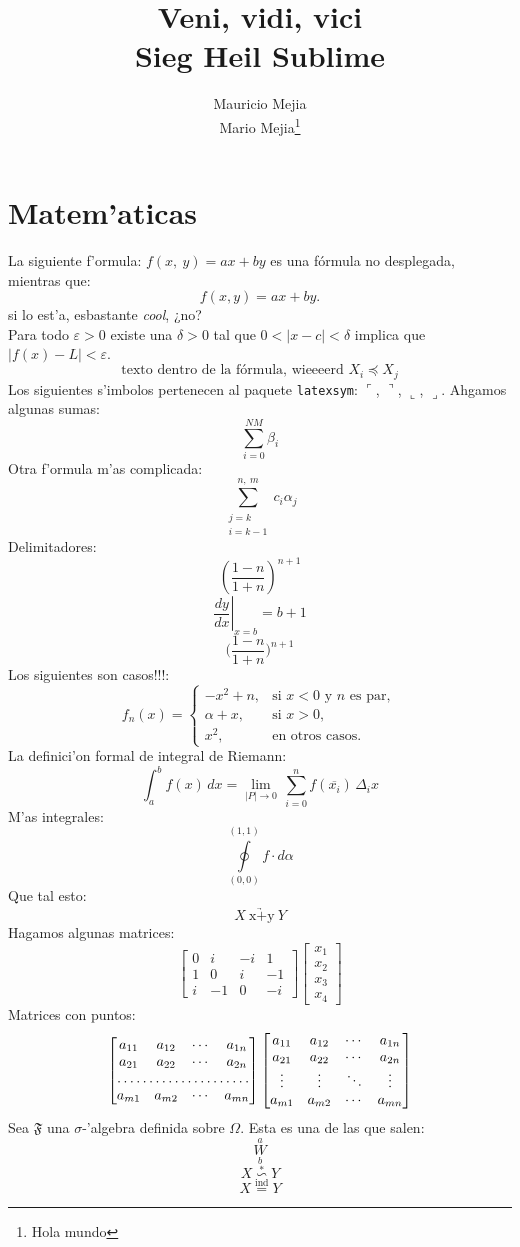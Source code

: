 \documentclass[11pt,titlepage]{article}
\title{Veni, vidi, vici\\\small{Sieg Heil Sublime}}
\author{Mauricio Mejia\\Mario Mejia\thanks{Hola mundo}}
\theoremstyle{plain}
\theoremstyle{defintion}
\theoremstyle{remark}
\begin{document}
\maketitle
\section{Matem'aticas}
La siguiente f'ormula: $f(x,\ y)=ax+by$ es una fórmula no desplegada, mientras que:
\[f(x,y)=ax+by.\]
si lo est'a, esbastante {\it cool}, ¿no?
\\
Para todo $\varepsilon>0$ existe una $\delta>0$ tal que $0<|x-c|<\delta$ implica que $|f(x)-L|<\varepsilon$.
\[
\text{texto dentro de la fórmula, wieeeerd\ }
X_i \preccurlyeq X_j
\]
Los siguientes s'imbolos pertenecen al paquete {\tt latexsym}: $\ulcorner$, $\urcorner$, $\llcorner$, $\lrcorner$.
Ahgamos algunas sumas:
\[
\sum_{i=0}^{NM} \beta_i
\]
Otra f'ormula m'as complicada:
\[
\sum_{\substack{j=k\\i=k-1}}^{n,\ m}c_{i}\alpha_{j}
\]
Delimitadores:
\[
\left( \frac{1-n}{1+n} \right)^{n+1}
\]
\[
\left. \frac{dy}{dx} \right|_{x=b}=b+1
\]
\[
\biggl( \frac{1-n}{1+n} \biggr)^{n+1}
\]
Los siguientes son casos!!!:
\[f_n(x)=
	\begin{cases}
	-x^{2}+n,	&	\text{si $x<0$ y $n$ es par},\\
	\alpha +x,	&	\text{si $x>0$},\\
	x^{2},		&	\text{en otros casos.}
	\end{cases}
\]
La definici'on formal de integral de Riemann:
\[
\int_a^b f(x)\,dx=
\lim_{|P|\to 0}\,\sum_{i=0}^{n} f(\overline{x_i})\,\Delta_ix
\]
M'as integrales:
\[
\oint\limits_{(0,0)}^{(1,1)} f\cdot d\alpha
\]
Que tal esto:
\[
X\:\underrightarrow{\text{x+y}}\:Y
\]
Hagamos algunas matrices:
\[
	\begin{bmatrix}
	0 &  i & -i &  1\\
	1 &  0 &  i & -1\\
	i & -1 &  0 & -i
	\end{bmatrix}
	\begin{bmatrix}
	x_1 \\ x_2 \\ x_3 \\ x_4
	\end{bmatrix}
\]
Matrices con puntos:
\[
	\begin{bmatrix}
	a_{11} & a_{12} & \cdots & a_{1n}\\
	a_{21} & a_{22} & \cdots & a_{2n}\\
	\hdotsfor{4}\\
	a_{m1} & a_{m2} & \cdots & a_{mn}
	\end{bmatrix}
	\begin{bmatrix}
	a_{11} & a_{12} & \cdots & a_{1n}\\
	a_{21} & a_{22} & \cdots & a_{2n}\\
	\vdots & \vdots & \ddots & \vdots\\
	a_{m1} & a_{m2} & \cdots & a_{mn}
	\end{bmatrix}
\]
Sea $\mathfrak{F}$ una $\sigma$-'algebra definida sobre $\Omega$.
Esta es una de las que salen:
\[
\overset{a}{\underset{b}{W}}
\]
\[
X \overset{*}{\backsim} Y
\]
\[
X \overset{\text{ind}}{=} Y
\]
\end{document}
